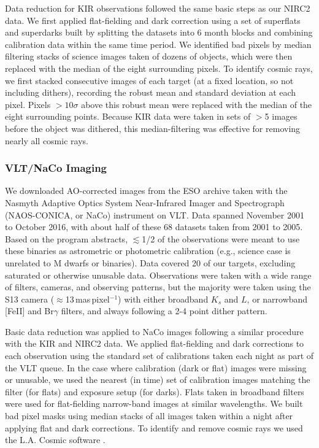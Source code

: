 \documentclass[twocolumn]{aastex62}
\begin{document}
Data reduction for KIR observations followed the same basic steps as our NIRC2 data. We first applied flat-fielding and dark correction using a set of superflats and superdarks built by splitting the datasets into 6 month blocks and combining calibration data within the same time period. We identified bad pixels by median filtering stacks of science images taken of dozens of objects, which were then replaced with the median of the eight surrounding pixels. To identify cosmic rays, we first stacked consecutive images of each target (at a fixed location, so not including dithers), recording the robust mean and standard deviation at each pixel. Pixels $>10\sigma$ above this robust mean were replaced with the median of the eight surrounding points. Because KIR data were taken in sets of $>$5 images before the object was dithered, this median-filtering was effective for removing nearly all cosmic rays.


\subsubsection{VLT/NaCo Imaging}

We downloaded AO-corrected images from the ESO archive taken with the Nasmyth Adaptive Optics System Near-Infrared Imager and Spectrograph (NAOS-CONICA, or NaCo) instrument on VLT. Data spanned November 2001 to October 2016, with about half of these 68 datasets taken from 2001 to 2005. Based on the program abstracts, $\lesssim$1/2 of the observations were meant to use these binaries as astrometric or photometric calibration (e.g., science case is unrelated to M dwarfs or binaries). Data covered 20 of our targets, excluding saturated or otherwise unusable data. Observations were taken with a wide range of filters, cameras, and observing patterns, but the majority were taken using the S13 camera ($\approx$13\,mas\,pixel$^{-1}$) with either broadband $K_s$ and $L$, or narrowband [FeII] and Br$\gamma$ filters, and always following a 2-4 point dither pattern. 

Basic data reduction was applied to NaCo images following a similar procedure with the KIR and NIRC2 data. We applied flat-fielding and dark corrections to each observation using the standard set of calibrations taken each night as part of the VLT queue. In the case where calibration (dark or flat) images were missing or unusable, we used the nearest (in time) set of calibration images matching the filter (for flats) and exposure setup (for darks). Flats taken in broadband filters were used for flat-fielding narrow-band images at similar wavelengths. We built bad pixel masks using median stacks of all images taken within a night after applying flat and dark corrections. To identify and remove cosmic rays we used the L.A. Cosmic software \citep{2001PASP..113.1420V}.
\end{document}
